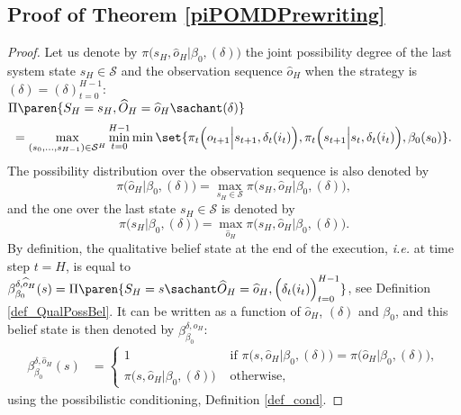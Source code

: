 









\subsection{Proof of Theorem \ref{piPOMDPrewriting}}
\label{piPOMDPrewriting_RETURN}
\begin{proof}
Let us denote by $\pi \Big( s_H, \widehat{o}_H  \Big\vert \beta_0, (\delta) \Big)$
the joint possibility degree of the last system state $s_H \in \mathcal{S}$
and the observation sequence $\widehat{o}_H$ when the strategy is $(\delta) = (\delta)_{t=0}^{H-1}$:\\
$\Pi \paren{ S_H = s_H, \widehat{O}_H = \widehat{o}_H  \sachant (\delta) }$
\[  =\max_{(s_0,\ldots,s_{H-1}) \in \mathcal{S}^H} \min_{t=0}^{H-1} \min \set{ \pi_t \Big( o_{t+1} \Big\vert s_{t+1}, \delta_t(i_t) \Big), \pi_t \Big( s_{t+1} \Big\vert s_t,\delta_t(i_t) \Big), \beta_0(s_0)}. \]
The possibility distribution over the observation sequence is also denoted by
\[ \pi \Big( \widehat{o}_H  \Big\vert \beta_0, (\delta) \Big) = \max_{s_H \in \mathcal{S}} \pi \Big( s_H, \widehat{o}_H  \Big\vert \beta_0, (\delta) \Big), \] 
and the one over the last state $s_H \in \mathcal{S}$ is denoted by
\[ \pi \Big( s_H \Big\vert \beta_0, (\delta) \Big) 
= \max_{\widehat{o}_H} \pi \Big( s_H, \widehat{o}_H  \Big\vert \beta_0, (\delta) \Big). \]
By definition, the qualitative belief state at the end of the execution, \textit{i.e.} at time step $t=H$,
is equal to $\beta^{\delta,\widehat{o}_H}_{\beta_0}(s) = \Pi \paren{ S_H = s \sachant \widehat{O}_H = \widehat{o}_H , \Big(\delta_t(i_t)\Big)_{t=0}^{H-1} }$,
see Definition \ref{def_QualPossBel}. 
It can be written as a function of $\widehat{o}_H$, $(\delta)$ and $\beta_0$,
and this belief state is then denoted by $\beta^{\delta,\widehat{o}_H}_{\beta_0}$:
\begin{align*}
\beta^{\delta,\widehat{o}_H}_{\beta_0}(s) &= \left\{ \begin{array}{ccc} 1 & \mbox{ if } \pi \Big( s, \widehat{o}_H \Big\vert \beta_0, (\delta) \Big) =   
\pi \Big( \widehat{o}_H \Big\vert \beta_0, (\delta) \Big), \\
\pi \Big( s, \widehat{o}_H \Big\vert \beta_0, (\delta) \Big) & \mbox{ otherwise, }
\end{array} \right.
\end{align*}
using the possibilistic conditioning, Definition \ref{def_cond}.


\end{proof}
